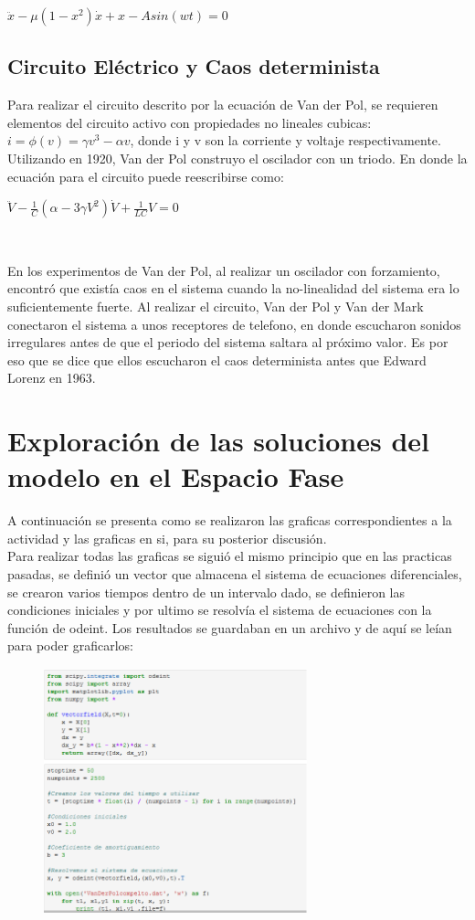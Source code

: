 \documentclass[12pt]{article}
\begin{document}
\centerline{$ \ddot x -\mu (1-x^2) \dot x +x - A sin(wt)= 0$}

\subsection{Circuito Eléctrico y Caos determinista}
Para realizar el circuito descrito por la ecuación de Van der Pol, se requieren elementos del circuito activo con propiedades no lineales cubicas: $ i = \phi (v) = \gamma v^3 - \alpha v$, donde i y v son la corriente y voltaje respectivamente. Utilizando en 1920, Van der Pol construyo el oscilador con un triodo. En donde la ecuación para el circuito puede reescribirse como:  \\

\centerline{$ \ddot V - \frac{1}{C}(\alpha -3 \gamma V^2) \dot V + \frac{1}{LC}V = 0$}
$   $

En los experimentos de Van der Pol, al realizar un oscilador con forzamiento, encontró que existía caos en el sistema cuando la no-linealidad del sistema era lo suficientemente fuerte. Al realizar el circuito, Van der Pol y Van der Mark conectaron el sistema a unos receptores de telefono, en donde escucharon sonidos irregulares antes de que el periodo del sistema saltara al próximo valor. Es por eso que se dice que ellos escucharon el caos determinista antes que Edward Lorenz en 1963.

\section{Exploración de las soluciones del modelo en el Espacio Fase}
A continuación se presenta como se realizaron las graficas correspondientes a la actividad y las graficas en si, para su posterior discusión. \\

Para realizar todas las graficas se siguió el mismo principio que en las practicas pasadas, se definió un vector que almacena el sistema de ecuaciones diferenciales, se crearon varios tiempos dentro de un intervalo dado, se definieron las condiciones iniciales y por ultimo se resolvía el sistema de ecuaciones con la función de odeint. Los resultados se guardaban en un archivo y de aquí se leían para poder graficarlos:

\begin{figure}[h!]
    \centering
\includegraphics[width=3in]{Cod1.png}
\end{figure}
\end{document}
